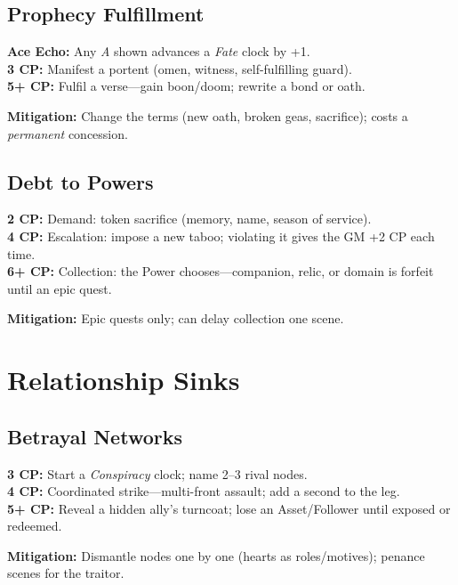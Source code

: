 \subsection{Prophecy Fulfillment}
\begin{tcolorbox}[enhanced,sharp corners,boxrule=.6pt,title={CP Menu}]
\textbf{Ace Echo:} Any \emph{A} shown advances a \emph{Fate} clock by +1.\\
\textbf{3 CP:} Manifest a portent (omen, witness, self-fulfilling guard).\\
\textbf{5+ CP:} Fulfil a verse—gain boon/doom; rewrite a bond or oath.
\end{tcolorbox}
\textbf{Mitigation:} Change the terms (new oath, broken geas, sacrifice); costs a \emph{permanent} concession.

\subsection{Debt to Powers}
\begin{tcolorbox}[enhanced,sharp corners,boxrule=.6pt,title={CP Menu}]
\textbf{2 CP:} Demand: token sacrifice (memory, name, season of service).\\
\textbf{4 CP:} Escalation: impose a new taboo; violating it gives the GM +2 CP each time.\\
\textbf{6+ CP:} Collection: the Power chooses—companion, relic, or domain is forfeit until an epic quest.
\end{tcolorbox}
\textbf{Mitigation:} Epic quests only; \SuitDiamond{} can delay collection one scene.

\section{Relationship Sinks}
\subsection{Betrayal Networks}
\begin{tcolorbox}[enhanced,sharp corners,boxrule=.6pt,title={CP Menu}]
\textbf{3 CP:} Start a \emph{Conspiracy} clock; name 2--3 rival nodes.\\
\textbf{4 CP:} Coordinated strike—multi-front assault; add a second \SuitClub{} to the leg.\\
\textbf{5+ CP:} Reveal a hidden ally’s turncoat; lose an Asset/Follower until exposed or redeemed.
\end{tcolorbox}
\textbf{Mitigation:} Dismantle nodes one by one (hearts as roles/motives); penance scenes for the traitor.

